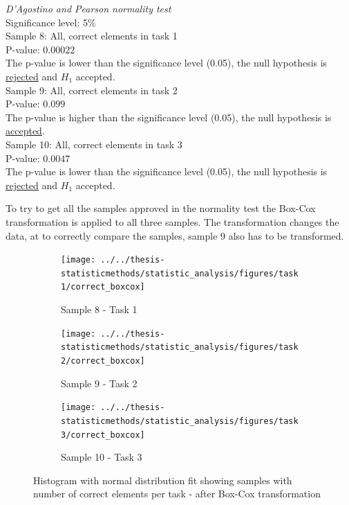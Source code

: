  \begin{center}
 	\begin{tcolorbox}[box align=center,width=\textwidth-5cm]
 		\centering
 		\textit{D'Agostino and Pearson normality test}\\
 		Significance level: 5\%  \\[0.5cm]
 		
 		Sample 8: All, correct elements in task 1 \\
 		P-value: $0.00022$\\
 		The p-value is lower than the significance level (0.05), the null hypothesis is \underline{rejected} and $H_1$ accepted.\\[0.5cm]
 		
 		Sample 9: All, correct elements in task 2 \\
 		P-value: $0.099$ \\
 		The p-value is higher than the significance level (0.05), the null hypothesis is \underline{accepted}. \\[0.5cm]
 		
 		Sample 10: All, correct elements in task 3 \\
 		P-value: $0.0047$ \\
 		The p-value is lower than the significance level (0.05), the null hypothesis is \underline{rejected} and $H_1$ accepted.\\[0.5cm]
 	\end{tcolorbox} 
 \end{center}

To try to get all the samples approved in the normality test the Box-Cox transformation is applied to all three samples. The transformation changes the data, at to correctly compare the samples, sample 9 also has to be transformed. 


\begin{figure}[h!]
	\centering
	\begin{subfigure}[b]{0.3\textwidth}
		\centering
		\texttt{[image: ../../thesis-statisticmethods/statistic\_analysis/figures/task1/correct\_boxcox]}
		\caption{Sample 8 - Task 1}
		\label{fig:correctboxcox_task1}
	\end{subfigure}
	\begin{subfigure}[b]{0.3\textwidth}
		\centering
		\texttt{[image: ../../thesis-statisticmethods/statistic\_analysis/figures/task2/correct\_boxcox]}
		\caption{Sample 9 - Task 2}
		\label{fig:correctboxcox_task2}
	\end{subfigure}
	\begin{subfigure}[b]{0.3\textwidth}
		\centering
		\texttt{[image: ../../thesis-statisticmethods/statistic\_analysis/figures/task3/correct\_boxcox]}
		\caption{Sample 10 - Task 3}
		\label{fig:correctboxcox_task3}
	\end{subfigure}
	\caption{Histogram with normal distribution fit showing samples with number of correct elements per task - after Box-Cox transformation}
\end{figure}



